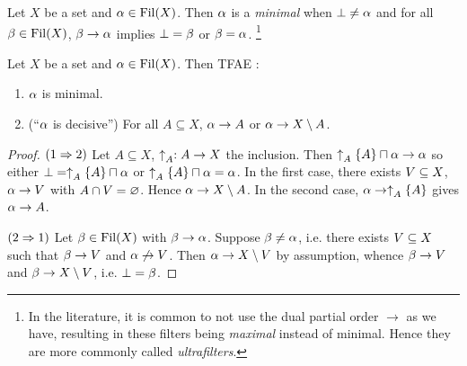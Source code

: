 \documentclass[main.tex]{subfiles}
\begin{document}
\begin{dfn} 
  
  Let $X$ be a set and $\alpha \in \operatorname{Fil}(X)$.
  Then $\alpha$ is a \emph{minimal} when 
  $\bot \neq \alpha$ and for all $\beta \in \operatorname{Fil}(X)$, 
  $\beta \to \alpha$ implies $\bot = \beta$ or $\beta = \alpha$.
  \footnote{
    In the literature,
    it is common to not use the dual partial order $\to$ as we have,
    resulting in these filters being \emph{maximal} instead of minimal.
    Hence they are more commonly called 
    \emph{ultrafilters}.
  }
\end{dfn}

\begin{prop} 
  
  Let $X$ be a set and $\alpha \in \operatorname{Fil}(X)$.
  Then TFAE : 
  \begin{enumerate}
    \item $\alpha$ is minimal.
    \item (``$\alpha$ is decisive'') 
    For all $A \subseteq X$, $\alpha \to A$ or $\alpha \to X\setminus A$.
  \end{enumerate}
\end{prop}
\begin{proof}
  $(1\Rightarrow 2)$ 
  Let $A \subseteq X$, $\uparrow_{A}^{} : A \to X$ the inclusion.
  Then $\uparrow_{A}^{}\left\{A\right\} \sqcap \alpha \to \alpha$ so 
  either $\bot = \uparrow_{A}^{}\left\{A\right\} \sqcap \alpha$ or 
  $\uparrow_{A}^{}\left\{A\right\} \sqcap \alpha = \alpha$.
  In the first case, there exists $V \subseteq X$, $\alpha \to V$ 
  with $A \cap V = \varnothing$. 
  Hence $\alpha \to X\setminus A$.
  In the second case, $\alpha \to \uparrow_{A}^{}\left\{A\right\}$ gives $\alpha \to A$.

  $(2\Rightarrow 1)$ 
  Let $\beta \in \operatorname{Fil}(X)$ with $\beta \to \alpha$.
  Suppose $\beta \neq \alpha$, i.e. there exists $V \subseteq X$ such that 
  $\beta \to V$ and $\alpha \not\to V$.
  Then $\alpha \to X\setminus V$ by assumption,
  whence $\beta \to V$ and $\beta \to X\setminus V$, i.e. $\bot = \beta$.
\end{proof}
\end{document}
